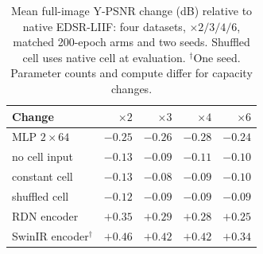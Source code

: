\documentclass{article}
\begin{document}
\begin{table}[t]\centering\small
\caption{Mean full-image Y-PSNR change (dB) relative to native EDSR-LIIF: four datasets, $\times2/3/4/6$, matched 200-epoch arms and two seeds. Shuffled cell uses native cell at evaluation. $^\dagger$One seed. Parameter counts and compute differ for capacity changes.}
\label{tab:budget}
\begin{tabular}{lrrrr}\toprule
Change & $\times2$ & $\times3$ & $\times4$ & $\times6$\\\midrule
MLP $2\times64$ & $-0.25$ & $-0.26$ & $-0.28$ & $-0.24$\\
no cell input & $-0.13$ & $-0.09$ & $-0.11$ & $-0.10$\\
constant cell & $-0.13$ & $-0.08$ & $-0.09$ & $-0.10$\\
shuffled cell & $-0.12$ & $-0.09$ & $-0.09$ & $-0.09$\\
RDN encoder & $+0.35$ & $+0.29$ & $+0.28$ & $+0.25$\\
SwinIR encoder$^\dagger$ & $+0.46$ & $+0.42$ & $+0.42$ & $+0.34$\\\bottomrule
\end{tabular}
\end{table}
\end{document}
